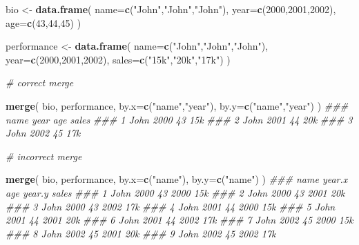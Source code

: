\documentclass[]{book}
\newenvironment{Shaded}{\begin{snugshade}}{\end{snugshade}}
\newcommand{\CommentTok}[1]{\textcolor[rgb]{0.56,0.35,0.01}{\textit{#1}}}
\newcommand{\DataTypeTok}[1]{\textcolor[rgb]{0.13,0.29,0.53}{#1}}
\newcommand{\DecValTok}[1]{\textcolor[rgb]{0.00,0.00,0.81}{#1}}
\newcommand{\KeywordTok}[1]{\textcolor[rgb]{0.13,0.29,0.53}{\textbf{#1}}}
\newcommand{\NormalTok}[1]{#1}
\newcommand{\StringTok}[1]{\textcolor[rgb]{0.31,0.60,0.02}{#1}}
\theoremstyle{definition}
\theoremstyle{definition}
\theoremstyle{definition}
\theoremstyle{remark}
\begin{document}
\begin{Shaded}
\begin{Highlighting}[]
\NormalTok{bio <-}\StringTok{ }\KeywordTok{data.frame}\NormalTok{( }\DataTypeTok{name=}\KeywordTok{c}\NormalTok{(}\StringTok{"John"}\NormalTok{,}\StringTok{"John"}\NormalTok{,}\StringTok{"John"}\NormalTok{),}
                   \DataTypeTok{year=}\KeywordTok{c}\NormalTok{(}\DecValTok{2000}\NormalTok{,}\DecValTok{2001}\NormalTok{,}\DecValTok{2002}\NormalTok{),}
                   \DataTypeTok{age=}\KeywordTok{c}\NormalTok{(}\DecValTok{43}\NormalTok{,}\DecValTok{44}\NormalTok{,}\DecValTok{45}\NormalTok{) )}

\NormalTok{performance <-}\StringTok{ }\KeywordTok{data.frame}\NormalTok{( }\DataTypeTok{name=}\KeywordTok{c}\NormalTok{(}\StringTok{"John"}\NormalTok{,}\StringTok{"John"}\NormalTok{,}\StringTok{"John"}\NormalTok{),}
                           \DataTypeTok{year=}\KeywordTok{c}\NormalTok{(}\DecValTok{2000}\NormalTok{,}\DecValTok{2001}\NormalTok{,}\DecValTok{2002}\NormalTok{),}
                           \DataTypeTok{sales=}\KeywordTok{c}\NormalTok{(}\StringTok{"15k"}\NormalTok{,}\StringTok{"20k"}\NormalTok{,}\StringTok{"17k"}\NormalTok{) )}

\CommentTok{# correct merge}

\KeywordTok{merge}\NormalTok{( bio, performance, }\DataTypeTok{by.x=}\KeywordTok{c}\NormalTok{(}\StringTok{"name"}\NormalTok{,}\StringTok{"year"}\NormalTok{), }\DataTypeTok{by.y=}\KeywordTok{c}\NormalTok{(}\StringTok{"name"}\NormalTok{,}\StringTok{"year"}\NormalTok{) ) }
\CommentTok{###   name year age sales}
\CommentTok{### 1 John 2000  43   15k}
\CommentTok{### 2 John 2001  44   20k}
\CommentTok{### 3 John 2002  45   17k}


\CommentTok{# incorrect merge}

\KeywordTok{merge}\NormalTok{( bio, performance, }\DataTypeTok{by.x=}\KeywordTok{c}\NormalTok{(}\StringTok{"name"}\NormalTok{), }\DataTypeTok{by.y=}\KeywordTok{c}\NormalTok{(}\StringTok{"name"}\NormalTok{) )  }
\CommentTok{###   name year.x age year.y sales}
\CommentTok{### 1 John   2000  43   2000   15k}
\CommentTok{### 2 John   2000  43   2001   20k}
\CommentTok{### 3 John   2000  43   2002   17k}
\CommentTok{### 4 John   2001  44   2000   15k}
\CommentTok{### 5 John   2001  44   2001   20k}
\CommentTok{### 6 John   2001  44   2002   17k}
\CommentTok{### 7 John   2002  45   2000   15k}
\CommentTok{### 8 John   2002  45   2001   20k}
\CommentTok{### 9 John   2002  45   2002   17k}
\end{Highlighting}
\end{Shaded}
\end{document}
